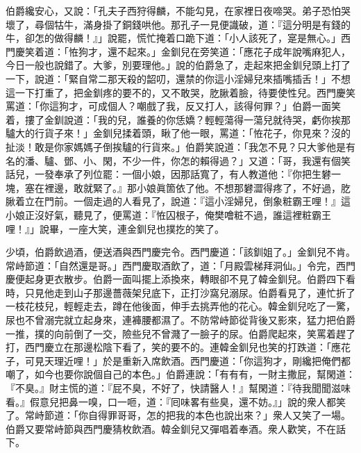 伯爵纔安心，又說：「孔夫子西狩得麟，不能勾見，在家裡日夜啼哭。弟子恐怕哭壞了，尋個牯牛，滿身掛了銅錢哄他。那孔子一見便識破，道：『這分明是有錢的牛，卻怎的做得麟！』」說罷，慌忙掩着口跪下道：「小人該死了，寔是無心。」西門慶笑着道：「恠狗才，還不起來。」金釧兒在旁笑道：「應花子成年說嘴麻犯人，今日一般也說錯了。{}大爹，別要理他。」說的伯爵急了，走起來把金釧兒頭上打了一下，說道：「緊自常二那天殺的韶叨，還禁的你這小淫婦兒來插嘴插舌！」不想這一下打重了，把金釧疼的要不的，又不敢哭，肐䐐着臉，待要使性兒。西門慶笑罵道：「你這狗才，可成個人？嘲戲了我，反又打人，該得何罪？」伯爵一面笑着，摟了金釧說道：「我的兒，誰養的你恁嬌？輕輕蕩得一蕩兒就待哭，虧你挨那驢大的行貨子來！」金釧兒揉着頭，瞅了他一眼，罵道：「恠花子，你見來？沒的扯淡！敢是你家媽媽子倒挨驢的行貨來。」伯爵笑說道：「我怎不見？只大爹他是有名的潘、驢、鄧、小、閑，不少一件，你怎的賴得過？」又道：「哥，我還有個笑話兒，一發奉承了列位罷：一個小娘，因那話寬了，有人教道他：『你把生礬一塊，塞在裡邊，敢就緊了。』那小娘眞箇依了他。不想那礬澀得疼了，不好過，肐䐐着立在門前。一個走過的人看見了，說道：『這小淫婦兒，倒象粧霸王哩！』這小娘正沒好氣，聽見了，便罵道：『恠囚根子，俺樊噲粧不過，誰這裡粧霸王哩！』」說畢，一座大笑，連金釧兒也撲扢的笑了。

少頃，伯爵飲過酒，便送酒與西門慶完令。西門慶道：「該釧姐了。」金釧兒不肯。常峙節道：「自然還是哥。」西門慶取酒飲了，道：「月殿雲梯拜洞仙。」令完，西門慶便起身更衣散步。伯爵一面叫擺上添換來，轉眼卻不見了韓金釧兒。伯爵四下看時，只見他走到山子那邊薔薇架兒底下，正打沙窩兒溺尿。伯爵看見了，連忙折了一枝花枝兒，輕輕走去，蹲在他後面，伸手去挑弄他的花心。韓金釧兒吃了一驚，尿也不曾溺完就立起身來，連褲腰都濕了。{}不防常峙節從背後又影來，猛力把伯爵一推，撲的向前倒了一交，險些兒不曾濺了一臉子的尿。{}伯爵爬起來，笑罵着趕了打，西門慶立在那邊松陰下看了，笑的要不的。連韓金釧兒也笑的打跌道：「應花子，可見天理近哩！」於是重新入席飲酒。西門慶道：「你這狗才，剛纔把俺們都嘲了，如今也要你說個自己的本色。」伯爵連說：「有有有，一財主撒屁，幫閑道：『不臭。』財主慌的道：『屁不臭，不好了，快請醫人！』幫閑道：『待我聞聞滋味看。』假意兒把鼻一嗅，口一咂，{}道：『囘味畧有些臭，還不妨。』」說的衆人都笑了。常峙節道：「你自得罪哥哥，怎的把我的本色也說出來？」衆人又笑了一場。伯爵又要常峙節與西門慶猜枚飲酒。韓金釧兒又彈唱着奉酒。衆人歡笑，不在話下。

